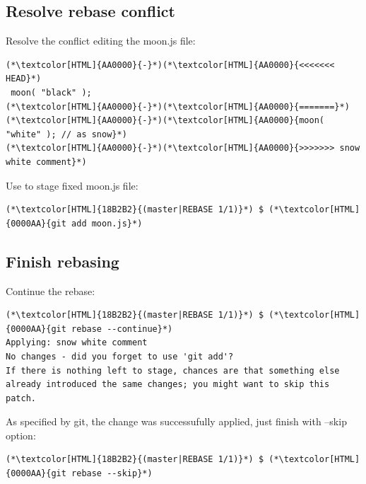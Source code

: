 \subsection{Resolve rebase conflict}
\begin{frame}[fragile]
  \subslidetitle
  Resolve the conflict editing the moon.js file:

  \begin{lstlisting}
(*\textcolor[HTML]{AA0000}{-}*)(*\textcolor[HTML]{AA0000}{<<<<<<< HEAD}*)
 moon( "black" );
(*\textcolor[HTML]{AA0000}{-}*)(*\textcolor[HTML]{AA0000}{=======}*)
(*\textcolor[HTML]{AA0000}{-}*)(*\textcolor[HTML]{AA0000}{moon( "white" ); // as snow}*)
(*\textcolor[HTML]{AA0000}{-}*)(*\textcolor[HTML]{AA0000}{>>>>>>> snow white comment}*)
\end{lstlisting}
  Use  to stage fixed moon.js file:
  \begin{lstlisting}
(*\textcolor[HTML]{18B2B2}{(master|REBASE 1/1)}*) $ (*\textcolor[HTML]{0000AA}{git add moon.js}*)
\end{lstlisting}
\end{frame}

\subsection{Finish rebasing}
\begin{frame}[fragile]
  \subslidetitle
  Continue the rebase:
  \begin{lstlisting}
(*\textcolor[HTML]{18B2B2}{(master|REBASE 1/1)}*) $ (*\textcolor[HTML]{0000AA}{git rebase --continue}*)
Applying: snow white comment
No changes - did you forget to use 'git add'?
If there is nothing left to stage, chances are that something else
already introduced the same changes; you might want to skip this patch.
\end{lstlisting}

  As specified by git, the change was successufully applied, just finish with --skip option:
  \begin{lstlisting}
(*\textcolor[HTML]{18B2B2}{(master|REBASE 1/1)}*) $ (*\textcolor[HTML]{0000AA}{git rebase --skip}*)
\end{lstlisting}
\end{frame}
